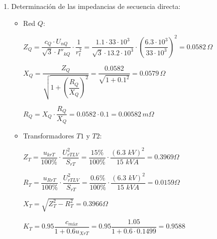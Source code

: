             \begin{enumerate}
                \item Determinación de las impedancias de secuencia directa:
                    \begin{itemize}
                        \item Red $Q$:\vspace{2mm}
                        
                        $Z_\textit{Q} = \dfrac{c_\textit{Q}\cdot U_\textit{nQ}}{\sqrt{3}\cdot I''_\textit{kQ}}\cdot \dfrac{1}{r_\textit{t}^2} = 
                        \dfrac{1.1\cdot 33\cdot 10^3}{\sqrt{3}\cdot 13.2\cdot 10^3}\cdot \left(\dfrac{6.3\cdot 10^3}{33\cdot 10^3}\right)^2 = 0.0582\,\varOmega$\vspace{2mm}

                        $X_\textit{Q} = \dfrac{Z_\textit{Q}}{\sqrt{1+\left(\dfrac{R_\textit{Q}}{X_\textit{Q}}\right)^2}} = 
                        \dfrac{0.0582}{\sqrt{1+0.1^2}} = 0.0579\,\varOmega$\vspace{2mm}

                        $R_\textit{Q} = X_\textit{Q}\cdot\dfrac{R_\textit{Q}}{X_\textit{Q}} = 
                        0.0582\cdot 0.1 = 0.00582\,\textit{m}\varOmega$\vspace{2mm}

                        \item Transformadores $T1$ y $T2$:\vspace{2mm}
                        
                        $Z_\textit{T} = \dfrac{u_\textit{krT}}{100\%} \cdot \dfrac{U_\textit{rTLV}^2}{S_\textit{rT}} = 
                        \dfrac{15\!\text{\%}}{100\!\text{\%}} \cdot \dfrac{(6.3 \textit{ kV})^2}{15 \textit{ kVA}} = 0.3969 \varOmega$\vspace{2mm}

                        $R_\textit{T} = \dfrac{u_\textit{RrT}}{100\%} \cdot \dfrac{U_\textit{rTLV}^2}{S_\textit{rT}}= 
                        \dfrac{0.6\!\text{\%}}{100\!\text{\%}} \cdot \dfrac{(6.3 \textit{ kV})^2}{15 \textit{ kVA}} = 0.0159 \varOmega$\vspace{2mm}

                        $X_\textit{T} = \sqrt{Z_\textit{T}^2 - R_\textit{T}^2} = 0.3966 \varOmega$\vspace{2mm}

                        $K_\textit{T} = 0.95 \dfrac{c_\textit{máx}}{1 + 0.6 u_\textit{XrT}} = 0.95 \dfrac{1.05}{1 + 0.6 \cdot 0.1499} = 0.9588$\vspace{2mm}


\end{itemize}
\end{enumerate}
